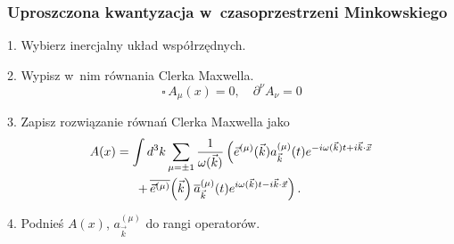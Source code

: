 \documentclass[10pt,t]{beamer}
\begin{document}
\begin{frame}
  \frametitle{Uproszczona kwantyzacja w~czasoprzestrzeni Minkowskiego}


  1. Wybierz inercjalny układ współrzędnych.

  2. Wypisz w~nim równania Clerka Maxwella.
  \begin{equation}
    \label{eq:Czemu-rozwazanie-03}
    \square \, A_{ \mu }( x ) = 0, \quad \partial^{ \nu } A_{ \nu } = 0
  \end{equation}

  \vspace{-1.5em}



  3. Zapisz rozwiązanie równań Clerka Maxwella jako
  \begin{equation}
    \label{eq:Czemu-rozwazanie-04}
    \begin{split}
      A( x )
      &=
        \int d^{ 3 }k \sum_{ \mu = \pm 1 } \frac{ 1 }{ \omega( \vec{ k } ) }
        \left( \vec{ e }^{ ( \mu ) }( \vec{ k } ) a_{ \vec{ k } }^{ ( \mu ) }( t )
        e^{ -i \omega( \vec{ k } ) t + i \vec{ k } \cdot \vec{ x } } \right. \\
      &\hspace{1.5em}
        \left. + \, \overline{ \vec{ e }^{ ( \mu ) } }\!\left( \vec{ k } \right)
        \overline{ a }_{ \vec{ k } }^{ ( \mu ) }( t )
        e^{ i \omega( \vec{ k } ) t - i \vec{ k } \cdot \vec{ x } } \right).
    \end{split}
  \end{equation}

  \vspace{-1em}



  4. Podnieś $A( x )$, $a_{ \vec{ k } }^{ ( \mu ) }$ do rangi
  operatorów.

\end{frame}
\end{document}
